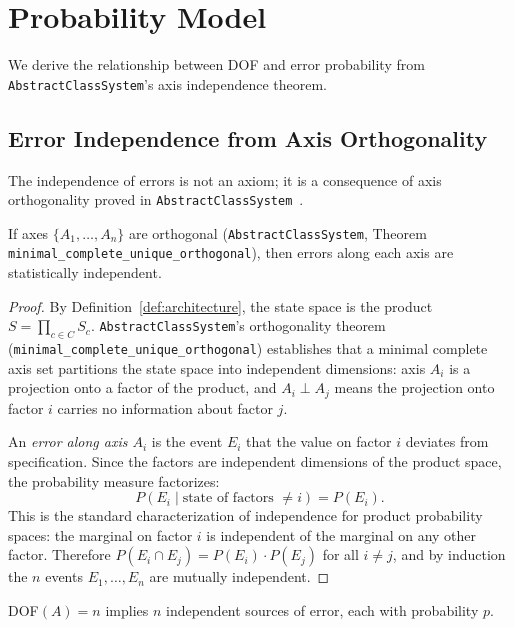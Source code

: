 \section{Probability Model}\label{probability-model}

We derive the relationship between DOF and error probability from \texttt{AbstractClassSystem}'s axis independence theorem.

\subsection{Error Independence from Axis Orthogonality}

The independence of errors is not an axiom; it is a consequence of axis orthogonality proved in \texttt{AbstractClassSystem}~\cite{paper1_typing_discipline}.

\begin{theorem}\label{thm:error-independence}
If axes $\{A_1, \ldots, A_n\}$ are orthogonal (\texttt{AbstractClassSystem}, Theorem \texttt{minimal\_complete\_unique\_orthogonal}), then errors along each axis are statistically independent.
\end{theorem}

\begin{proof}
By Definition~\ref{def:architecture}, the state space is the product $S = \prod_{c \in C} S_c$. \texttt{AbstractClassSystem}'s orthogonality theorem (\texttt{minimal\_complete\_unique\_orthogonal}) establishes that a minimal complete axis set partitions the state space into independent dimensions: axis $A_i$ is a projection onto a factor of the product, and $A_i \perp A_j$ means the projection onto factor $i$ carries no information about factor $j$.

An \emph{error along axis $A_i$} is the event $E_i$ that the value on factor $i$ deviates from specification. Since the factors are independent dimensions of the product space, the probability measure factorizes:
\[
P(E_i \mid \text{state of factors } \neq i) = P(E_i).
\]
This is the standard characterization of independence for product probability spaces: the marginal on factor $i$ is independent of the marginal on any other factor. Therefore $P(E_i \cap E_j) = P(E_i) \cdot P(E_j)$ for all $i \neq j$, and by induction the $n$ events $E_1, \ldots, E_n$ are mutually independent.
\end{proof}

\begin{corollary}[DOF = Independent Error Sources]\label{cor:dof-errors}
DOF$(A) = n$ implies $n$ independent sources of error, each with probability $p$.
\end{corollary}

